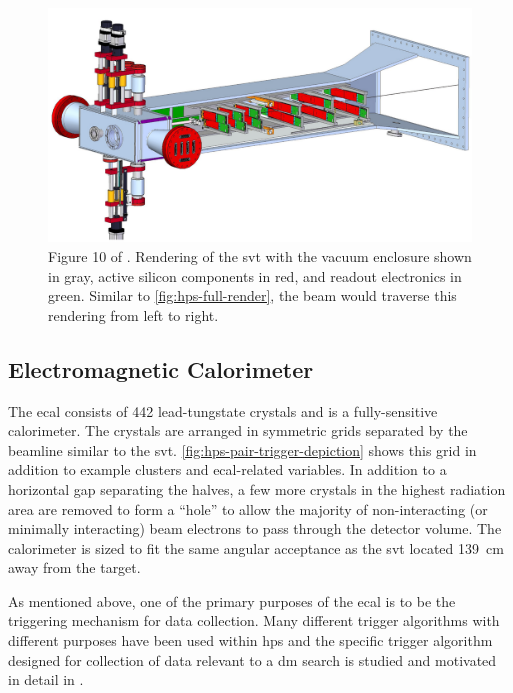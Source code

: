 \begin{figure}
	\centering
	\includegraphics*[width=\textwidth]{figures/hps/experiment/smkcarty-thesis-fig-10-svt-render.png}
	\caption{
		Figure 10 of \cite{skmccarty-thesis-2020}. Rendering of the \ac{svt} with the vacuum
		enclosure shown in gray, active silicon components in red, and readout electronics in
		green. Similar to \cref{fig:hps-full-render}, the beam would traverse this rendering
		from left to right.
	}
	\label{fig:hps-svt-render}
\end{figure}

\subsection{Electromagnetic Calorimeter}
\label{sec:hps-ecal}
The \ac{ecal} consists of \num{442} lead-tungstate crystals and is a fully-sensitive calorimeter.
The crystals are arranged in symmetric grids separated by the beamline similar to the \ac{svt}.
\cref{fig:hps-pair-trigger-depiction} shows this grid in addition to example clusters and \ac{ecal}-related
variables. In addition to a horizontal gap separating the halves, a few more crystals in the highest
radiation area are removed to form a ``hole'' to allow the majority of non-interacting (or minimally interacting)
beam electrons to pass through the detector volume. The calorimeter is sized to fit the same
angular acceptance as the \ac{svt} located \qty{139}{\cm} away from the target.

As mentioned above, one of the primary purposes of the \ac{ecal} is to be the triggering mechanism
for data collection. Many different trigger algorithms with different purposes have been used within
\ac{hps} and the specific trigger algorithm designed for collection of data relevant to a \ac{dm}
search is studied and motivated in detail in \cite{skmccarty-thesis-2020}.

